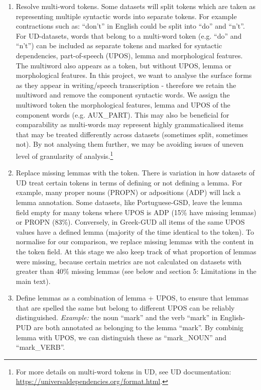 \documentclass[USenglish]{article}
\begin{document}
\begin{enumerate}
\item Resolve multi-word tokens. Some datasets will split tokens which are taken as representing multiple syntactic words into separate tokens. For example contractions such as: ``don't'' in English could be split into ``do'' and ``n't''. For UD-datasets, words that belong to a multi-word token (e.g. ``do'' and ``n't'') can be included as separate tokens and marked for syntactic dependencies, part-of-speech (UPOS), lemma and morphological features. The multiword also appears as a token, but without UPOS, lemma or morphological features. In this project, we want to analyse the surface forms as they appear in writing/speech transcription - therefore we retain the multiword and remove the component syntactic words. We assign the multiword token the morphological features, lemma and UPOS of the component words (e.g. AUX\_PART). This may also be beneficial for comparability as multi-words may represent highly grammaticalised items that may be treated differently across datasets (sometimes split, sometimes not). By not analysing them further, we may be avoiding issues of uneven level of granularity of analysis.\footnote{For more details on multi-word tokens in UD, see UD documentation: \url{https://universaldependencies.org/format.html}.}
\item Replace missing lemmas with the token. There is variation in how datasets of UD treat certain tokens in terms of defining or not defining a lemma. For example, many proper nouns (PROPN) or adpositions (ADP) will lack a lemma annotation. Some datasets, like Portuguese-GSD, leave the lemma field empty for many tokens where UPOS is ADP (15\% have missing lemmas) or PROPN (83\%). Conversely, in Greek-GUD all items of the same UPOS values have a defined lemma (majority of the time identical to the token). To normalise for our comparison, we replace missing lemmas with the content in the token field. At this stage we also keep track of what proportion of lemmas were missing, because certain metrics are not calculated on datasets with greater than 40\% missing lemmas (see below and section 5: Limitations in the main text).
\item Define lemmas as a combination of lemma + UPOS, to ensure that lemmas that are spelled the same but belong to different UPOS can be reliably distinguished. \textit{Example:} the noun ``mark'' and the verb ``mark'' in English-PUD are both annotated as belonging to the lemma ``mark''. By combinig lemma with UPOS, we can distinguish these as ``mark\_NOUN'' and ``mark\_VERB''.

\end{enumerate}
\end{document}
